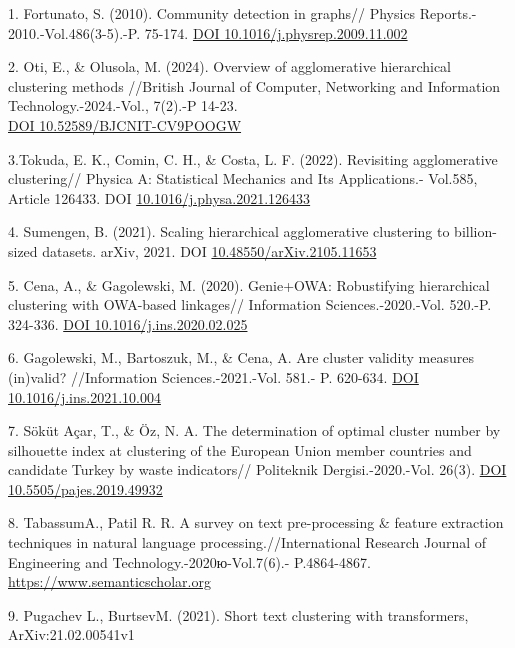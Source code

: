 \begin{references}
1. Fortunato, S. (2010). Community detection in graphs// Physics
Reports.- 2010.-Vol.486(3-5).-P. 75-174.
\href{https://doi.org/10.1016/j.physrep.2009.11.002}{DOI
10.1016/j.physrep.2009.11.002}

2. Oti, E., \& Olusola, M. (2024). Overview of agglomerative
hierarchical clustering methods //British Journal of Computer,
Networking and Information Technology.-2024.-Vol., 7(2).-P 14-23.
\\\href{https://doi.org/10.52589/BJCNIT-CV9POOGW}{DOI
10.52589/BJCNIT-CV9POOGW}

3.Tokuda, E. K., Comin, C. H., \& Costa, L. F. (2022). Revisiting
agglomerative clustering// Physica A: Statistical Mechanics and Its
Applications.- Vol.585, Article 126433. DOI
\href{https://doi.org/10.1016/j.physa.2021.126433}{10.1016/j.physa.2021.126433}


4. Sumengen, B. (2021). Scaling hierarchical agglomerative clustering to
billion-sized datasets. arXiv, 2021. DOI
\href{https://doi.org/10.48550/arXiv.2105.11653}{10.48550/arXiv.2105.11653}

5. Cena, A., \& Gagolewski, M. (2020). Genie+OWA: Robustifying
hierarchical clustering with OWA-based linkages// Information
Sciences.-2020.-Vol. 520.-P. 324-336.
\href{https://doi.org/10.1016/j.ins.2020.02.025}{DOI
10.1016/j.ins.2020.02.025}


6. Gagolewski, M., Bartoszuk, M., \& Cena, A. Are cluster validity
measures (in)valid? //Information Sciences.-2021.-Vol. 581.- P.
620-634. \href{https://doi.org/10.1016/j.ins.2021.10.004}{DOI
10.1016/j.ins.2021.10.004}

7. Söküt Açar, T., \& Öz, N. A. The determination of optimal cluster
number by silhouette index at clustering of the European Union member
countries and candidate Turkey by waste indicators// Politeknik
Dergisi.-2020.-Vol. 26(3). \href{https://doi.org/10.5505/pajes.2019.49932}{DOI 10.5505/pajes.2019.49932}

8. TabassumA., Patil R. R. A survey on text pre-processing \& feature
extraction techniques in natural language processing.//International
Research Journal of Engineering and Technology.-2020ю-Vol.7(6).-
P.4864-4867. \href{https://www.semanticscholar.org/paper/A-Survey-on-Text-Pre-Processing-\%26-Feature-in-Tabassum-Patil/f308488e996599115fe478c03b74a0b19b9a8f06}{https://www.semanticscholar.org}

9. Pugachev L., BurtsevM. (2021). Short text clustering with
transformers, ArXiv:21.02.00541v1


\end{references}

